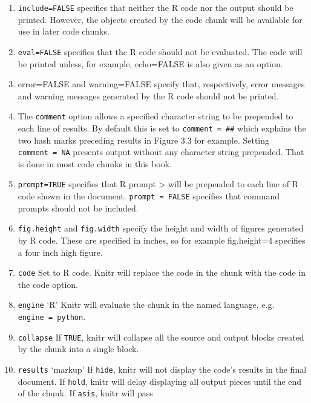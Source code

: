 \documentclass[]{article}
\begin{document}
\begin{enumerate}
\def\labelenumi{\arabic{enumi}.}
\setcounter{enumi}{1}
\item
  \texttt{include=FALSE} specifies that neither the R code nor the
  output should be printed. However, the objects created by the code
  chunk will be available for use in later code chunks.
\item
  \texttt{eval=FALSE} specifies that the R code should not be evaluated.
  The code will be printed unless, for example, echo=FALSE is also given
  as an option.
\item
  error=FALSE and warning=FALSE specify that, respectively, error
  messages and warning messages generated by the R code should not be
  printed.
\item
  The \texttt{comment} option allows a specified character string to be
  prepended to each line of results. By default this is set to
  \texttt{comment\ =\ \#\#} which explains the two hash marks preceding
  results in Figure 3.3 for example. Setting \texttt{comment\ =\ NA}
  presents output without any character string prepended. That is done
  in most code chunks in this book.
\item
  \texttt{prompt=TRUE} specifies that R prompt \textgreater{} will be
  prepended to each line of R code shown in the document.
  \texttt{prompt\ =\ FALSE} specifies that command prompts should not be
  included.
\item
  \texttt{fig.height} and \texttt{fig.width} specify the height and
  width of figures generated by R code. These are specified in inches,
  so for example fig.height=4 specifies a four inch high figure.
\item
  \texttt{code} Set to R code. Knitr will replace the code in the chunk
  with the code in the code option.
\item
  \texttt{engine} `R' Knitr will evaluate the chunk in the named
  language, e.g.
  \texttt{engine\ =\ \textquotesingle{}python\textquotesingle{}}.
\item
  \texttt{collapse} If \texttt{TRUE}, knitr will collapse all the source
  and output blocks created by the chunk into a single block.
\item
  \texttt{results} `markup' If
  \texttt{\textquotesingle{}hide\textquotesingle{}}, knitr will not
  display the code's results in the final document. If
  \texttt{\textquotesingle{}hold\textquotesingle{}}, knitr will delay
  displaying all output pieces until the end of the chunk. If
  \texttt{\textquotesingle{}asis\textquotesingle{}}, knitr will pass

\end{enumerate}
\end{document}
